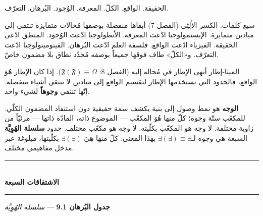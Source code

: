 \documentclass[10pt, openany, oneside]{book}
\renewcommand{\normalsize}{\fontsize{10}{13}\selectfont}
\begin{document}
\noindent الحقيقة. الواقع. الكلّ. المعرفة. الوُجود. البُرهان. التعرّف.

سبع كلمات. الكسر الأَلِثِي (الفصل 7) أبقاها منفصلة بوصفها مُحالات متمايزة تنتمي إلى ميادين متمايزة. الإبستمولوجيا ادّعت المعرفة. الأنطولوجيا ادّعت الوُجود. المنطق ادّعى الحقيقة. الفيزياء ادّعت الواقع. فلسفة العلم ادّعت البُرهان. الفينومينولوجيا ادّعت التعرّف. و«الكلّ» طاف فوقها جميعاً بوصفه مُحدِّد نطاق بلا مضمون خاصّ.

الميتا-إطار أنهى الإطار في مُحاله إليه (الفصل 8: $\mathfrak{F}(\mathfrak{F}) \equiv \Omega$). إذا كان الإطار هُوَ الواقع، فالحدود التي يستخدمها الإطار لتقسيم الواقع إلى ميادين لا تنتقي أشياء منفصلة. إنّها تنتقي \textbf{وجوهاً} لشيء واحد.

\textbf{الوجه} هو نمط وصول إلى بنية يكشف سمة حقيقية دون استنفاد المضمون الكلّي. للمكعّب ستّة وجوه؛ كلّ منها هُوَ المكعّب --- الموضوع ذاته، المادّة ذاتها --- مرئيّاً من زاوية مختلفة. لا وجه هو المكعّب بكلّيته. لا وجه هو مكعّب مختلف. حدود \textbf{سلسلة الهُوِيَّة} السبعة هي وجوه لـ$\exists(\exists) \equiv \exists$ بهذا المعنى: كلّ منها هِيَ $\exists(\exists)$ بكلّيتها، مبلوغة عبر مدخل مفاهيمي مختلف.

\vspace{1.5em}


\begin{center}
    \rule{0.3\textwidth}{0.4pt}\\[0.5em]
    {\normalsize\bfseries الاشتقاقات السبعة}\\[0.3em]
    \rule{0.3\textwidth}{0.4pt}
\end{center}

\vspace{1em}

\textbf{جدول البُرهان 9.1} --- \textit{سلسلة الهُوِيَّة}

\vspace{0.5em}
\end{document}
